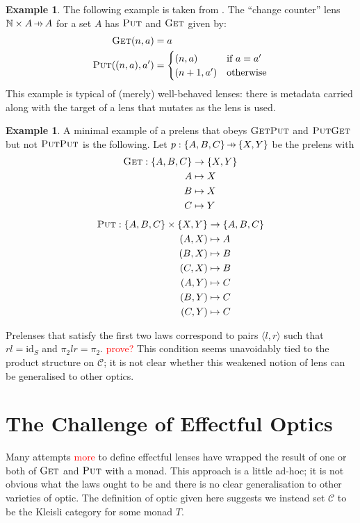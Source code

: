 \documentclass[11pt,a4paper]{article}
\theoremstyle{plain}
\theoremstyle{definition}
\newtheorem{example}[theorem]{Example}
\newcommand{\C}{\mathscr{C}}
\newcommand{\bN}{\mathbb{N}}
\newcommand{\id}{\mathrm{id}}
\newcommand{\fget}{\textsc{Get}}
\newcommand{\fput}{\textsc{Put}}
\newcommand{\hto}{\ensuremath{\,\mathaccent\shortmid\rightarrow\,}}
\newcommand{\todo}[1]{\textcolor{red}{\small #1}}
\begin{document}
\begin{example}
The following example is taken from \cite{AClearPictureOfLensLaws}. The ``change counter'' lens $\bN \times A \hto A$ for a set $A$ has $\fput$ and $\fget$ given by:
\begin{align*}
\fget(n, a) &= a \\
\fput((n, a), a') &= \begin{cases}
(n, a) & \text{if } a = a' \\
(n+1, a') & \text{otherwise}
\end{cases}
\end{align*}
This example is typical of (merely) well-behaved lenses: there is metadata carried along with the target of a lens that mutates as the lens is used.
\end{example}

\begin{example}
A minimal example of a prelens that obeys $\fget\fput$ and $\fput\fget$ but not $\fput\fput$ is the following. Let $p : \{A,B,C\} \hto \{X, Y\}$ be the prelens with
\begin{align*}
\fget : \{A,B,C\} &\to \{X, Y\} \\
A &\mapsto X \\
B &\mapsto X \\
C &\mapsto Y 
\end{align*}
\begin{align*}
\fput : \{A,B,C\} \times \{X, Y\} &\to \{A,B,C\} \\
(A,X) &\mapsto A \\
(B,X) &\mapsto B \\
(C,X) &\mapsto B \\
(A,Y) &\mapsto C \\
(B,Y) &\mapsto C \\
(C,Y) &\mapsto C
\end{align*}
\end{example}

Prelenses that satisfy the first two laws correspond to pairs $\langle l, r \rangle$ such that $rl = \id_S$ and $\pi_2lr = \pi_2$. \todo{prove?} This condition seems unavoidably tied to the product structure on $\C$; it is not clear whether this weakened notion of lens can be generalised to other optics.

\section{The Challenge of Effectful Optics}

Many attempts \cite{ReflectionsOnMonadicLenses} \todo{more} to define effectful lenses have wrapped the result of one or both of $\fget$ and $\fput$ with a monad. This approach is a little ad-hoc; it is not obvious what the laws ought to be and there is no clear generalisation to other varieties of optic. The definition of optic given here suggests we instead set $\C$ to be the Kleisli category for some monad $T$.
\end{document}

